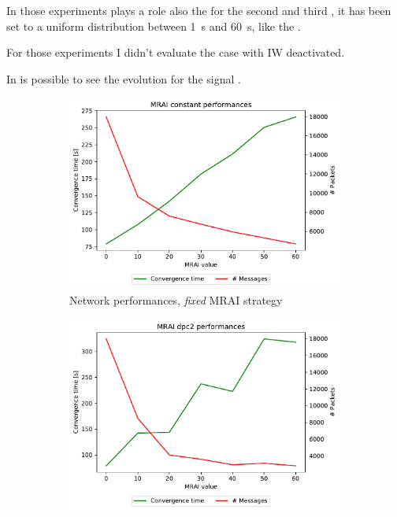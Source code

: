 In those experiments plays a role also the 
for the second and third , it has been set to a uniform distribution
between \SI{1}{\second} and \SI{60}{\second}, like the .

For those experiments I didn't evaluate the case with \ac{IW} deactivated.


In  is possible to see the evolution
for the signal .

\begin{figure}[h]
     \centering
     \begin{subfigure}[b]{0.45\textwidth}
         \centering
         \includegraphics[width=\textwidth]{images/internet_like/1000/signals/AWA/constant/internet_like-constant_AWA_mrai_evolution.pdf}
		 \caption{Network performances, \textit{fixed} \ac{MRAI} strategy}
         \label{fig:internet_like_1000_fixed_AWA}
     \end{subfigure}
     \hfill
     \begin{subfigure}[b]{0.45\textwidth}
         \centering
         \includegraphics[width=\textwidth]{images/internet_like/1000/signals/AWA/dpc/internet_like-DPC_AWA_mrai_evolution.pdf}

\end{subfigure}
\end{figure}
